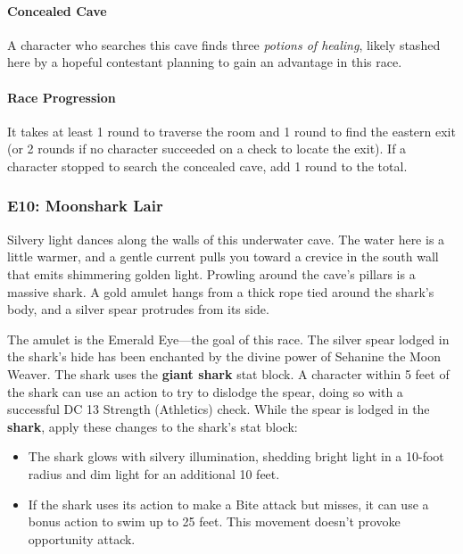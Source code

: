 \documentclass[letterpaper, 11pt, bg=full, twocolumn]{dndbook}
\begin{document}
\paragraph{Concealed Cave}

A character who searches this cave finds three \textit{potions of healing}, likely stashed here by a hopeful contestant planning to gain an advantage in this race.

\paragraph{Race Progression}

It takes at least 1 round to traverse the room and 1 round to find the eastern exit (or 2 rounds if no character succeeded on a check to locate the exit). If a character stopped to search the concealed cave, add 1 round to the total.

\subsubsection{E10: Moonshark Lair}

\begin{DndReadAloud}
Silvery light dances along the walls of this underwater cave. The water here is a little warmer, and a gentle current pulls you toward a crevice in the south wall that emits shimmering golden light. Prowling around the cave's pillars is a massive shark. A gold amulet hangs from a thick rope tied around the shark's body, and a silver spear protrudes from its side.
\end{DndReadAloud}

The amulet is the Emerald Eye---the goal of this race. The silver spear lodged in the shark's hide has been enchanted by the divine power of Sehanine the Moon Weaver. The shark uses the \textbf{giant shark} stat block. A character within 5 feet of the shark can use an action to try to dislodge the spear, doing so with a successful DC 13 Strength (Athletics) check. While the spear is lodged in the \textbf{shark}, apply these changes to the shark's stat block:

\begin{itemize}
\item The shark glows with silvery illumination, shedding bright light in a 10-foot radius and dim light for an additional 10 feet.
\item If the shark uses its action to make a Bite attack but misses, it can use a bonus action to swim up to 25 feet. This movement doesn't provoke opportunity attack.
\end{itemize}
\end{document}
